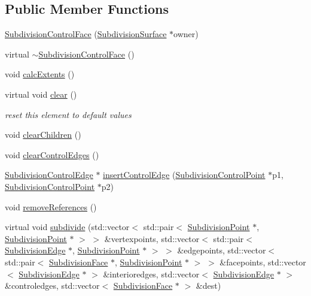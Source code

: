 \subsection*{Public Member Functions}
\begin{DoxyCompactItemize}
\item 
\hyperlink{classShipCADGeometry_1_1SubdivisionControlFace_a9316495869082b0e3e27092118913644}{Subdivision\-Control\-Face} (\hyperlink{classShipCADGeometry_1_1SubdivisionSurface}{Subdivision\-Surface} $\ast$owner)
\item 
virtual \hyperlink{classShipCADGeometry_1_1SubdivisionControlFace_a7b092e764ec2708674afdb210196f761}{$\sim$\-Subdivision\-Control\-Face} ()
\item 
void \hyperlink{classShipCADGeometry_1_1SubdivisionControlFace_a611c74ce3f346a745d4a694f5aab4ec2}{calc\-Extents} ()
\item 
virtual void \hyperlink{classShipCADGeometry_1_1SubdivisionControlFace_ad168e31f0ef2537b3cd0f58b0c1c54e2}{clear} ()
\begin{DoxyCompactList}\small\item\em reset this element to default values \end{DoxyCompactList}\item 
void \hyperlink{classShipCADGeometry_1_1SubdivisionControlFace_a1501212af025c7e33ede929d50a76651}{clear\-Children} ()
\item 
void \hyperlink{classShipCADGeometry_1_1SubdivisionControlFace_ad8d1c627c87a5f151610b446dd889bf7}{clear\-Control\-Edges} ()
\item 
\hyperlink{classShipCADGeometry_1_1SubdivisionControlEdge}{Subdivision\-Control\-Edge} $\ast$ \hyperlink{classShipCADGeometry_1_1SubdivisionControlFace_af585a1c8300791375b2df87fe2ebc4f5}{insert\-Control\-Edge} (\hyperlink{classShipCADGeometry_1_1SubdivisionControlPoint}{Subdivision\-Control\-Point} $\ast$p1, \hyperlink{classShipCADGeometry_1_1SubdivisionControlPoint}{Subdivision\-Control\-Point} $\ast$p2)
\item 
void \hyperlink{classShipCADGeometry_1_1SubdivisionControlFace_a1c5253075cbe1f05ba004bee4edb8698}{remove\-References} ()
\item 
virtual void \hyperlink{classShipCADGeometry_1_1SubdivisionControlFace_a2f4b7c97d87649d302ef512b1b8db707}{subdivide} (std\-::vector$<$ std\-::pair$<$ \hyperlink{classShipCADGeometry_1_1SubdivisionPoint}{Subdivision\-Point} $\ast$, \hyperlink{classShipCADGeometry_1_1SubdivisionPoint}{Subdivision\-Point} $\ast$ $>$ $>$ \&vertexpoints, std\-::vector$<$ std\-::pair$<$ \hyperlink{classShipCADGeometry_1_1SubdivisionEdge}{Subdivision\-Edge} $\ast$, \hyperlink{classShipCADGeometry_1_1SubdivisionPoint}{Subdivision\-Point} $\ast$ $>$ $>$ \&edgepoints, std\-::vector$<$ std\-::pair$<$ \hyperlink{classShipCADGeometry_1_1SubdivisionFace}{Subdivision\-Face} $\ast$, \hyperlink{classShipCADGeometry_1_1SubdivisionPoint}{Subdivision\-Point} $\ast$ $>$ $>$ \&facepoints, std\-::vector$<$ \hyperlink{classShipCADGeometry_1_1SubdivisionEdge}{Subdivision\-Edge} $\ast$ $>$ \&interioredges, std\-::vector$<$ \hyperlink{classShipCADGeometry_1_1SubdivisionEdge}{Subdivision\-Edge} $\ast$ $>$ \&controledges, std\-::vector$<$ \hyperlink{classShipCADGeometry_1_1SubdivisionFace}{Subdivision\-Face} $\ast$ $>$ \&dest)

\end{DoxyCompactItemize}
